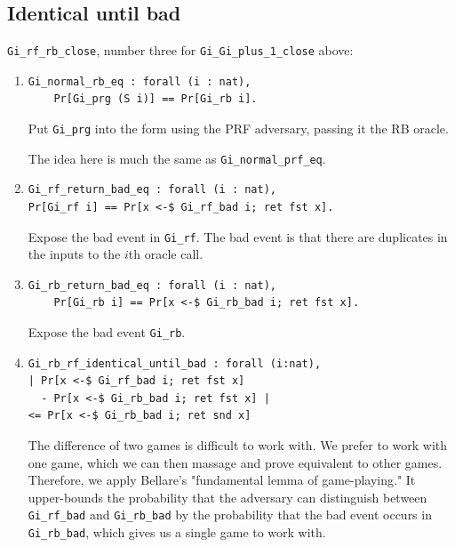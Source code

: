 \documentclass[12pt,lot, lof]{puthesis}
\newcommand{\li} {\lstinline}
\begin{document}
{\subsection{Identical until bad} \label{sec:identical_until_bad}

\lstinline|Gi_rf_rb_close|, number three for \lstinline|Gi_Gi_plus_1_close| above:
\begin{enumerate}
\par
\item \begin{lstlisting}
Gi_normal_rb_eq : forall (i : nat),
    Pr[Gi_prg (S i)] == Pr[Gi_rb i].
    \end{lstlisting} 
    
Put \li|Gi_prg| into the form using the PRF adversary, passing it the RB oracle.

The idea here is much the same as \li|Gi_normal_prf_eq|.

\par
\item \begin{lstlisting} 
Gi_rf_return_bad_eq : forall (i : nat),
Pr[Gi_rf i] == Pr[x <-$ Gi_rf_bad i; ret fst x].
  \end{lstlisting}
  
  Expose the bad event in \li|Gi_rf|. The bad event is that there are duplicates in the inputs to the $i$th oracle call.

\par
\item \begin{lstlisting}
Gi_rb_return_bad_eq : forall (i : nat),
    Pr[Gi_rb i] == Pr[x <-$ Gi_rb_bad i; ret fst x].
\end{lstlisting}

Expose the bad event \li|Gi_rb|.

\par
\item \begin{lstlisting}
Gi_rb_rf_identical_until_bad : forall (i:nat), 
| Pr[x <-$ Gi_rf_bad i; ret fst x] 
  - Pr[x <-$ Gi_rb_bad i; ret fst x] | 
<= Pr[x <-$ Gi_rb_bad i; ret snd x]
\end{lstlisting}                                

The difference of two games is difficult to work with. We prefer to work with one game, which we can then massage and prove equivalent to other games. Therefore, we apply Bellare's "fundamental lemma of game-playing." It upper-bounds the probability that the adversary can distinguish between \li|Gi_rf_bad| and \li|Gi_rb_bad| by the probability that the bad event occurs in \li|Gi_rb_bad|, which gives us a single game to work with.


\end{enumerate}}
\end{document}
